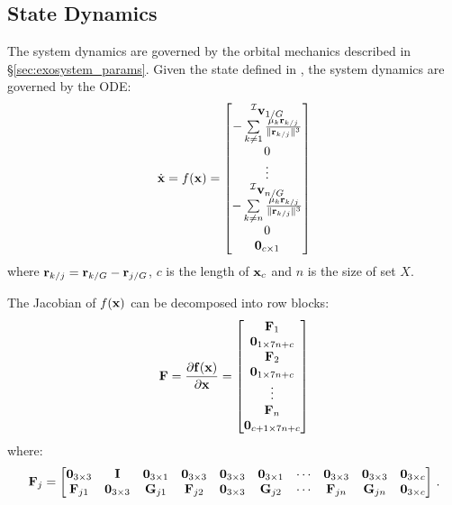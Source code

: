 \subsection{State Dynamics}
The system dynamics are governed by the orbital mechanics described in \S\ref{sec:exosystem_params}. Given the state defined in , the system dynamics are governed by the ODE:
\begin{equation}\label{eq:state_update}
\dot{\mathbf x} = f(\mathbf x) = \begin{bmatrix}  {}^\mathcal I \mathbf v_{1/G} \\  -\sum\limits_{k \ne 1}\frac{\mu_k \mathbf{r}_{k/j}}{\Vert\mathbf{r}_{k/j}\Vert^3} \\ 0 \\ \vdots \\  {}^\mathcal I \mathbf v_{n/G} \\  -\sum\limits_{k \ne n}\frac{\mu_k \mathbf{r}_{k/j}}{\Vert\mathbf{r}_{k/j}\Vert^3} \\ 0 \\ \mathbf{0}_{c\times1}  \end{bmatrix}
\end{equation}
where $\mathbf r_{k/j} = \mathbf r_{k/G} - \mathbf r_{j/G}$, $c$ is the length of $\mathbf x_{c}$ and $n$ is the size of set $X$.

The Jacobian of $f(\mathbf x)$ can be decomposed into row blocks:
\begin{equation}
\mathbf F = \frac{\partial \mathbf f(\mathbf x)}{\partial \mathbf x} = \begin{bmatrix} \mathbf F_1 \\ \mathbf 0_{1\times 7n+c} \\ \mathbf F_2 \\ \mathbf 0_{1\times7n+c}\\ \vdots \\ \mathbf F_n \\ \mathbf 0_{c+1 \times 7n + c} \end{bmatrix}
\end{equation}
where:
\begin{equation}
\mathbf F_j = \begin{bmatrix}
\mathbf{0}_{3\times 3} & \mathbf{I} &  \mathbf 0_{3\times1} & \mathbf{0}_{3\times 3}  &  \mathbf{0}_{3\times 3} & \mathbf 0_{3\times1} & \cdots & \mathbf{0}_{3\times 3} & \mathbf{0}_{3\times 3} & \mathbf{0}_{3\times c} \\
\mathbf F_{j1} &  \mathbf{0}_{3\times 3} & \mathbf G_{j1} & \mathbf F_{j2} & \mathbf{0}_{3\times 3} & \mathbf G_{j2} &  \cdots & \mathbf F_{jn} & \mathbf G_{jn} &  \mathbf{0}_{3\times c} \end{bmatrix} \, .
\end{equation}

